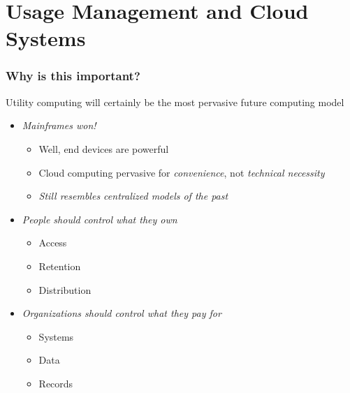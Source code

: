 \documentclass[t, 10pt]{beamer}
\begin{document}
\section{Usage Management and Cloud Systems}
\begin{frame}
\frametitle{Why is this important?}
Utility computing will certainly be the most pervasive future computing model \\
\begin{itemize}
\item \textit{Mainframes won!}
\begin{itemize}
\item Well, end devices are powerful
\item Cloud computing pervasive for \textit{convenience}, not \textit{technical necessity}
\item \textit{Still resembles centralized models of the past}
\end{itemize}
\item \textit{People should control what they own}
\begin{itemize}
\item Access
\item Retention
\item Distribution
\end{itemize}
\item \textit{Organizations should control what they pay for}
\begin{itemize}
\item Systems
\item Data
\item Records
\end{itemize}
\end{itemize}
\end{frame}
\end{document}

